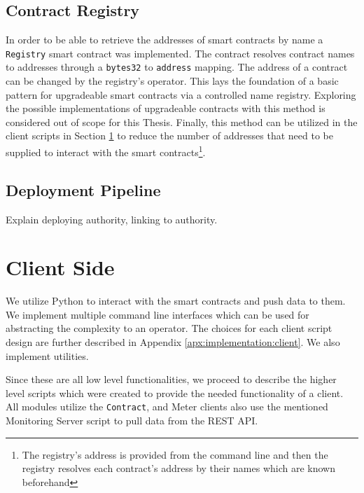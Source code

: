 \subsection{Contract Registry} 

In order to be able to retrieve the addresses of smart contracts by name a \texttt{Registry} smart contract was implemented. The contract resolves contract names to addresses through a \texttt{bytes32} to \texttt{address} mapping. The address of a contract can be changed by the registry's operator. This lays the foundation of a basic pattern for upgradeable smart contracts via a controlled name registry. Exploring the possible implementations of upgradeable contracts with this method is considered out of scope for this Thesis. Finally, this method can be utilized in the client scripts in Section \ref{ch:implementation:client} to reduce the number of addresses that need to be supplied to interact with the smart contracts\footnote{The registry's address is provided from the command line and then the registry resolves each contract's address by their names which are known beforehand}.

\subsection{Deployment Pipeline}

Explain deploying authority, linking to authority.

\section{Client Side} \label{ch:implementation:client}

We utilize Python to interact with the smart contracts and push data to them. We implement multiple command line interfaces which can be used for abstracting the complexity to an operator. The choices for each client script design are further described in Appendix \ref{apx:implementation:client}. We also implement utilities.

Since these are all low level functionalities, we proceed to describe the higher level scripts which were created to provide the needed functionality of a client. All modules utilize the \texttt{Contract}, and Meter clients also use the mentioned Monitoring Server script to pull data from the REST API.


